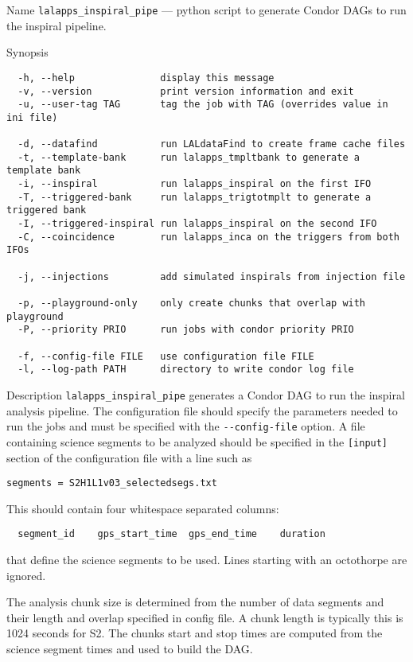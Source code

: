 \begin{entry}
\item[Name]
\verb$lalapps_inspiral_pipe$ --- python script to generate Condor DAGs to
run the inspiral pipeline.

\item[Synopsis]
\begin{verbatim}
  -h, --help               display this message
  -v, --version            print version information and exit
  -u, --user-tag TAG       tag the job with TAG (overrides value in ini file)

  -d, --datafind           run LALdataFind to create frame cache files
  -t, --template-bank      run lalapps_tmpltbank to generate a template bank
  -i, --inspiral           run lalapps_inspiral on the first IFO
  -T, --triggered-bank     run lalapps_trigtotmplt to generate a triggered bank
  -I, --triggered-inspiral run lalapps_inspiral on the second IFO
  -C, --coincidence        run lalapps_inca on the triggers from both IFOs

  -j, --injections         add simulated inspirals from injection file

  -p, --playground-only    only create chunks that overlap with playground
  -P, --priority PRIO      run jobs with condor priority PRIO

  -f, --config-file FILE   use configuration file FILE
  -l, --log-path PATH      directory to write condor log file
\end{verbatim}

\item[Description] \verb$lalapps_inspiral_pipe$ generates a Condor DAG to run
the inspiral analysis pipeline. The configuration file should specify the
parameters needed to run the jobs and must be specified with the
\verb$--config-file$ option.  A file containing science segments to be
analyzed should be specified in the \verb$[input]$ section of the
configuration file with a line such as
\begin{verbatim}
segments = S2H1L1v03_selectedsegs.txt
\end{verbatim}
This should contain four whitespace separated columns:
\begin{verbatim}
  segment_id    gps_start_time  gps_end_time    duration
\end{verbatim}
that define the science segments to be used. Lines starting with an octothorpe
are ignored.

The analysis chunk size is determined from the number of data segments and
their length and overlap specified in config file. A chunk length is typically
this is 1024 seconds for S2.  The chunks start and stop times are computed
from the science segment times and used to build the DAG.


\end{entry}

